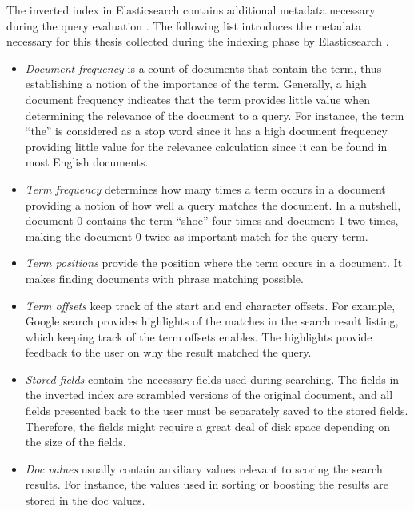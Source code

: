 The inverted index in Elasticsearch contains additional metadata necessary during the query evaluation
\cite{relevantSearch}. 
The following list introduces the metadata necessary for this thesis collected during the indexing phase by Elasticsearch
\cite{relevantSearch}.
\begin{itemize}
    \item \emph{Document frequency} is a count of documents that contain the term, thus 
    establishing a notion of the importance of the term. 
    Generally, a high document frequency indicates that the term provides little value when 
    determining the relevance of the document to a query.
    For instance, the term \enquote{the} is considered as a stop word 
    since it has a high document frequency providing little value 
    for the relevance calculation since it can be found in most English documents.
    
    \item \emph{Term frequency} determines how many times a term occurs in a document
    providing a notion of how well a query matches the document.
    In a nutshell, document 0 contains the term \enquote{shoe} four times and document 1 two times,
    making the document 0 twice as important match for the query term.
    
    \item \emph{Term positions} provide the position where the term occurs in a document. 
    It makes finding documents with phrase matching possible.
    
    \item \emph{Term offsets} keep track of the start and end character offsets. 
    For example, Google search provides highlights of the matches in the search result listing,
    which keeping track of the term offsets enables.
    The highlights provide feedback to the user on why the result matched the query.
    
    \item \emph{Stored fields} contain the necessary fields used during searching. 
    The fields in the inverted index are scrambled versions of the original document, and all fields 
    presented back to the user must be separately saved to the stored fields.
    Therefore, the fields might require a great deal of disk space depending on the size of the fields.
    
    \item \emph{Doc values} usually contain auxiliary values relevant to scoring the search results.
    For instance, the values used in sorting or boosting the results are stored in the doc values.
\end{itemize}

